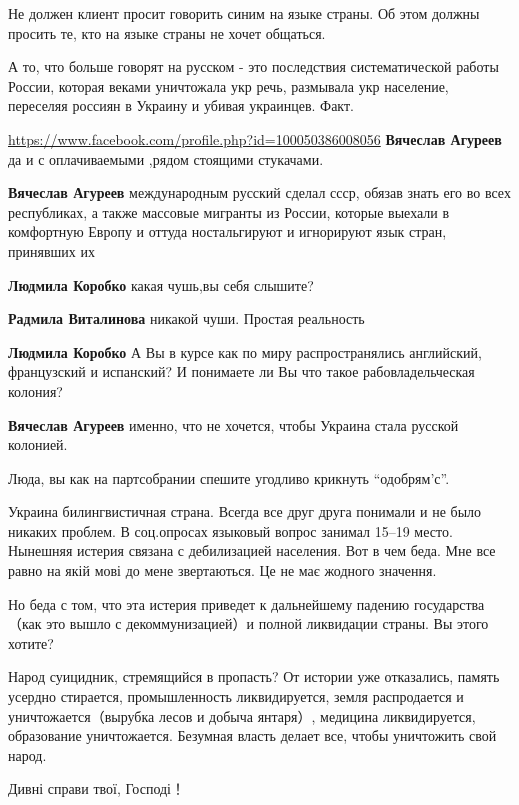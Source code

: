 \begin{itemize}
{\begin{itemize}
Не должен клиент просит говорить синим на языке страны. Об этом должны просить
те, кто на языке страны не хочет общаться.

А то, что больше говорят на русском - это последствия систематической работы
России, которая веками уничтожала укр речь, размывала укр население, переселяя
россиян в Украину и убивая украинцев. Факт.


\url{https://www.facebook.com/profile.php?id=100050386008056}
\textbf{Вячеслав Агуреев} да и с оплачиваемыми ,рядом стоящими стукачами.

\textbf{Вячеслав Агуреев} международным русский сделал ссср, обязав знать его во всех республиках, а также массовые мигранты из России, которые выехали в комфортную Европу и оттуда ностальгируют и игнорируют язык стран, принявших их

\textbf{Людмила Коробко} какая чушь,вы себя слышите?

\textbf{Радмила Виталинова} никакой чуши. Простая реальность

\textbf{Людмила Коробко} А Вы в курсе как по миру распространялись английский, французский и испанский? И понимаете ли Вы что такое рабовладельческая колония?

\textbf{Вячеслав Агуреев} именно, что не хочется, чтобы Украина стала русской колонией.


Люда, вы как на партсобрании спешите угодливо крикнуть \enquote{одобрям'с}.

Украина билингвистичная страна. Всегда все друг друга понимали и не было
никаких проблем. В соц.опросах языковый вопрос занимал 15--19 место. Нынешняя
истерия связана с дебилизацией населения. Вот в чем беда. Мне все равно на якій
мові до мене звертаються. Це не має жодного значення.

Но беда с том, что эта истерия приведет к дальнейшему падению государства（как
это вышло с декоммунизацией）и полной ликвидации страны. Вы этого хотите?

Народ суицидник, стремящийся в пропасть? От истории уже отказались, память
усердно стирается, промышленность ликвидируется, земля распродается и
уничтожается（вырубка лесов и добыча янтаря）, медицина ликвидируется,
образование уничтожается. Безумная власть делает все, чтобы уничтожить свой
народ.

Дивні справи твої, Господі！


\end{itemize}}
\end{itemize}
